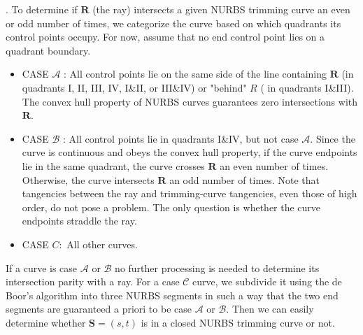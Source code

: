\documentclass[acmtog]{acmart}
\begin{document}
. To determine if $\mathbf{R}$ (the ray) intersects a given NURBS trimming curve an even or odd number of times, we categorize the curve based on which quadrants its control points occupy. For now, assume that no end control point lies on a quadrant boundary.

\begin{itemize}
    \item CASE $\mathcal{A}$ : All control points lie on the same side of the line containing $\mathbf{R}$ (in quadrants I, II, III, IV, I\&II, or III\&IV) or "behind" $R$ ( in quadrants I\&III). The convex hull property of NURBS curves guarantees zero intersections with $\mathbf{R}$.
    \item CASE $\mathcal{B}$ : All control points lie in quadrants I\&IV, but not case $\mathcal{A}$. Since the curve is continuous and obeys the convex hull property, if the curve endpoints lie in the same quadrant, the curve crosses $\mathbf{R}$ an even number of times. Otherwise, the curve intersects $\mathbf{R}$ an odd number of times. Note that tangencies between the ray and trimming-curve tangencies, even those of high order, do not pose a problem. The only question is whether the curve endpoints straddle the ray.
    \item CASE $C:$ All other curves.
\end{itemize}

If a curve is case $\mathcal{A}$ or $\mathcal{B}$ no further processing is needed to determine its intersection parity with a ray. For a case $\mathcal{C}$ curve, we subdivide it using the de Boor's algorithm into three NURBS segments in such a way that the two end segments are guaranteed a priori to be case $\mathcal{A}$ or $\mathcal{B}$. Then we can easily determine whether $\mathbf{S} = (s, t)$ is in a closed NURBS trimming curve or not.
\end{document}
